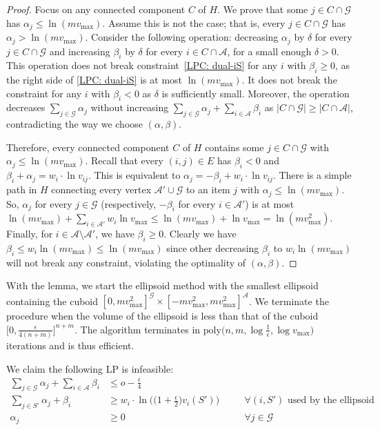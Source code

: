 \documentclass{theoretics}
\newcommand\calA{{\mathcal{A}}}
\newcommand\calG{{\mathcal{G}}}
\begin{document}
\begin{proof}
        Focus on any connected component $C$ of $H$. We prove that some $j \in C \cap \calG$ has $\alpha_j \leq \ln(m v_{\max})$. Assume this is not the case; that is, every $j \in C \cap \calG$ has $\alpha_j > \ln (m v_{\max})$. Consider the following operation: decreasing $\alpha_j$ by $\delta$ for every $j \in C \cap \calG$ and increasing $\beta_i$ by $\delta$ for every $i \in C \cap \calA$, for a small enough $\delta > 0$. This operation does not break constraint~\eqref{LPC: dual-iS} for any $i$ with $\beta_i \geq 0$, as the right side of \eqref{LPC: dual-iS} is at most $\ln (mv_{\max})$. It does not break the constraint for any $i$ with $\beta_i < 0$ as $\delta$ is sufficiently small.  Moreover, the operation decreases $\sum_{j \in \calG}\alpha_j$ without increasing $\sum_{j \in \calG}\alpha_j + \sum_{i \in \calA}\beta_i$ as $|C \cap \calG|\geq |C \cap \calA|$, contradicting the way we choose $(\alpha, \beta)$. 
        
        Therefore, every connected component $C$ of $H$ contains some $j \in C \cap \calG$ with $\alpha_j \leq \ln(m v_{\max})$. Recall that every $(i, j) \in E$ has $\beta_i < 0$ and $\beta_i + \alpha_j = w_i \cdot \ln v_{ij}$. This is equivalent to $\alpha_j  = -\beta_i + w_i \cdot \ln v_{ij}$. There is a simple path in $H$ connecting every vertex $\calA' \cup \calG$ to an item $j$ with $\alpha_j \leq \ln (mv_{\max})$. So, $\alpha_j$ for every $j \in \calG$ (respectively, $-\beta_i$ for every $i \in \calA'$) is at most $\ln (mv_{\max}) + \sum_{i \in \calA'} w_i \ln v_{\max} \leq \ln (mv_{\max}) + \ln v_{\max} = \ln(m v_{\max}^2)$. Finally, for $i \in \calA \setminus \calA'$, we have $\beta_i \geq 0$. Clearly we have $\beta_i \leq w_i\ln (mv_{\max}) \leq \ln (mv_{\max})$ since other decreasing $\beta_i$ to $w_i\ln (mv_{\max})$ will not break any constraint, violating the optimality of $(\alpha, \beta)$. 
    \end{proof}



    With the lemma, we start the ellipsoid method with the smallest ellipsoid containing the cuboid $[0, mv^2_{\max}]^{\calG} \times [-mv^2_{\max}, mv^2_{\max}]^{\calA}$.
    We terminate the procedure when the volume of the ellipsoid is less than that of the cuboid $\Big[0, \frac{\epsilon}{4(n+m)}\Big]^{n + m}$. The algorithm terminates in $\mathrm{poly}\big(n, m, \log \frac 1\epsilon, \log v_{\max}\big)$ iterations and is thus efficient.\medskip
    
    We claim the following LP is infeasible:
    \begin{align}
        \sum_{j \in \calG}\alpha_j + \sum_{i \in \calA} \beta_i &\leq o - \frac\epsilon 4 \label{LPC:dual-obj-1}\\
        \sum_{j \in S'} \alpha_j + \beta_i &\geq w_i \cdot \ln \Big(\big(1+\frac\epsilon2\big)v_i(S')\Big) &\quad &\forall (i, S') \text{ used by the ellipsoid method}\label{LPC: dual-iS-1}\\
        \alpha_j &\geq 0 &\quad &\forall j \in \calG \label{LPC:dual-alpha-1} 
    \end{align}
   
\end{document}
